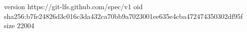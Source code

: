version https://git-lfs.github.com/spec/v1
oid sha256:b7fe24826d3c016c3da432ca70bb9a7023001ee635e4cba472474350302df95f
size 22004
